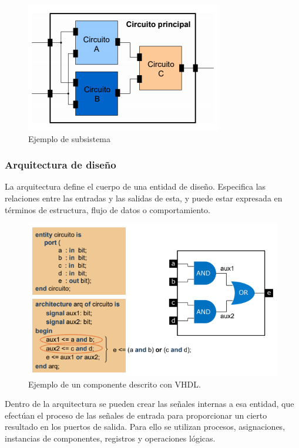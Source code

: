 \begin{figure}
\centering
\includegraphics[scale=.85]{./Figures/vhdl_ejemplo2.png}
\caption{Ejemplo de subsistema}
\label{interconexión de componentes}
\end{figure}


\subsubsection{Arquitectura de diseño}

La arquitectura define el cuerpo de una entidad de diseño. Especifica las relaciones entre las entradas y las salidas de esta, y puede estar expresada en términos de estructura, flujo de datos o comportamiento.


\begin{figure}
\centering
\includegraphics[scale=.65]{./Figures/vhdl_ejemplo.png}
\caption{Ejemplo de un componente descrito con VHDL.}
\label{componente vhdl}
\end{figure}

Dentro de la arquitectura se pueden crear las señales internas a esa entidad, que efectúan el proceso de las señales de entrada para proporcionar un cierto resultado en los puertos de salida. Para ello se utilizan procesos, asignaciones, instancias de componentes, registros y operaciones lógicas.


